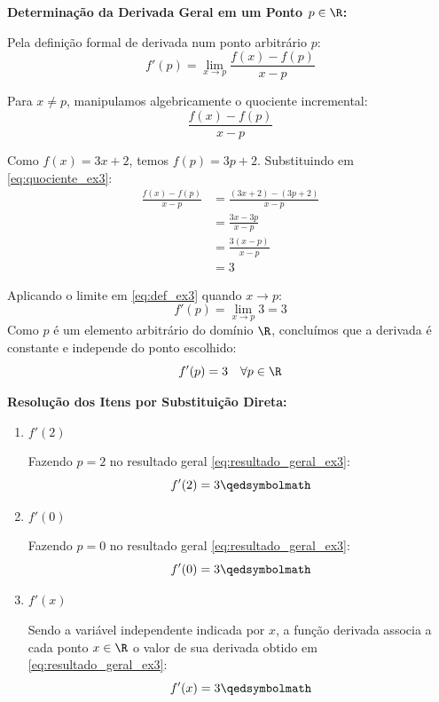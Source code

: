 \textbf{Determinação da Derivada Geral em um Ponto $p \in \R$:}

Pela definição formal de derivada num ponto arbitrário $p$:
\begin{equation}
    f'(p) = \lim_{x \to p} \frac{f(x) - f(p)}{x - p} \label{eq:def_ex3}
\end{equation}

Para $x \neq p$, manipulamos algebricamente o quociente incremental:
\begin{equation}
    \frac{f(x) - f(p)}{x - p} \label{eq:quociente_ex3}
\end{equation}

Como $f(x) = 3x + 2$, temos $f(p) = 3p + 2$. Substituindo em \eqref{eq:quociente_ex3}:
\begin{align*}
    \frac{f(x) - f(p)}{x - p} &= \frac{(3x + 2) - (3p + 2)}{x - p} \\[0.25cm]
    &= \frac{3x - 3p}{x - p} \\[0.25cm]
    &= \frac{3(x - p)}{x - p} \\[0.25cm]
    &= 3
\end{align*}

Aplicando o limite em \eqref{eq:def_ex3} quando $x \to p$:
\[
f'(p) = \lim_{x \to p} 3 = 3
\]
Como $p$ é um elemento arbitrário do domínio $\R$, concluímos que a derivada é constante e independe do ponto escolhido:
\begin{equation}
    f'(p) = 3 \quad \forall p \in \R \label{eq:resultado_geral_ex3}
\end{equation}

\vspace{0.3cm}
\textbf{Resolução dos Itens por Substituição Direta:}

\begin{enumerate}[label=\alph*)]
    \item $f'(2)$
    
    Fazendo $p = 2$ no resultado geral \eqref{eq:resultado_geral_ex3}:
    \[
    f'(2) = 3 \qedsymbolmath
    \]

    \item $f'(0)$
    
    Fazendo $p = 0$ no resultado geral \eqref{eq:resultado_geral_ex3}:
    \[
    f'(0) = 3 \qedsymbolmath
    \]

    \item $f'(x)$
    
    Sendo a variável independente indicada por $x$, a função derivada associa a cada ponto $x \in \R$ o valor de sua derivada obtido em \eqref{eq:resultado_geral_ex3}:
    \[
    f'(x) = 3 \qedsymbolmath
    \]
\end{enumerate}

